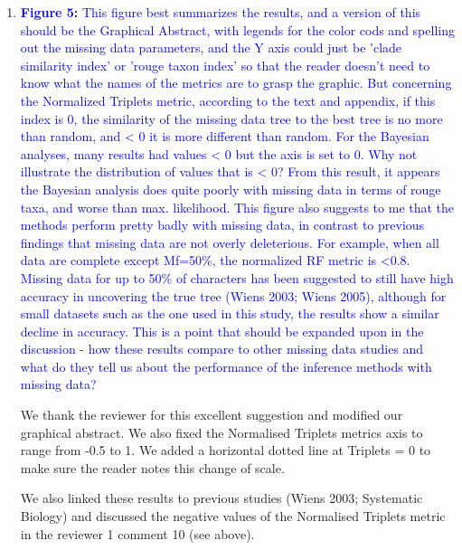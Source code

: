 \documentclass[12pt,letterpaper]{article}
\begin{document}
\begin{enumerate}
\item{\textcolor{blue}{\textbf{Figure 5:} This figure best summarizes the results, and a version of this should be the Graphical Abstract, with legends for the color cods and spelling out the missing data parameters, and the Y axis could just be 'clade similarity index' or 'rouge taxon index' so that the reader doesn't need to know what the names of the metrics are to grasp the graphic.
But concerning the Normalized Triplets metric, according to the text and appendix, if this index is 0, the similarity of the missing data tree to the best tree is no more than random, and < 0 it is more different than random.
For the Bayesian analyses, many results had values < 0 but the axis is set to 0.
Why not illustrate the distribution of values that is < 0? %
From this result, it appears the Bayesian analysis does quite poorly with missing data in terms of rouge taxa, and worse than max. likelihood.
This figure also suggests to me that the methods perform pretty badly with missing data, in contrast to previous findings that missing data are not overly deleterious.
For example, when all data are complete except Mf=50\%, the normalized RF metric is <0.8.
Missing data for up to 50\% of characters has been suggested to still have high accuracy in uncovering the true tree (Wiens 2003; Wiens 2005), although for small datasets such as the one used in this study, the results show a similar decline in accuracy.
This is a point that should be expanded upon in the discussion - how these results compare to other missing data studies and what do they tell us about the performance of the inference methods with missing data?}}

We thank the reviewer for this excellent suggestion and modified our graphical abstract. We also fixed the Normalised Triplets metrics axis to range from -0.5 to 1. We added a horizontal dotted line at Triplets = 0 to make sure the reader notes this change of scale.

We also linked these results to previous studies (Wiens 2003; Systematic Biology) and discussed the negative values of the Normalised Triplets metric in the reviewer 1 comment 10 (see above).


\end{enumerate}
\end{document}

